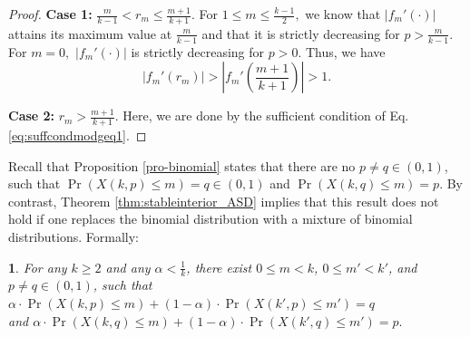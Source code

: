 \documentclass[12pt]{article}
\numberwithin{equation}{section}
\numberwithin{figure}{section}
\theoremstyle{definition}
\theoremstyle{plain}
\theoremstyle{plain}
\theoremstyle{plain}
\theoremstyle{remark}
\theoremstyle{plain}
\theoremstyle{plain}
\newtheorem{cor}{\protect\corollaryname}
\providecommand{\corollaryname}{Corollary}
\begin{document}
\begin{proof}
\textbf{Case 1:} $\frac{m}{k-1} < r_m \leq \frac{m+1}{k+1}$. 
For $1\leq m \leq \frac{k-1}{2},$ we know that $|f_m'(\cdot)|$ attains its maximum value at $\frac{m}{k-1}$ and that it is strictly decreasing for $p > \frac{m}{k-1}.$ For $m=0,$ $|f_m'(\cdot)|$ is strictly decreasing for $p>0.$ Thus, we have
\[
|f_m'(r_m)| > \left|f_m'\left(\frac{m+1}{k+1} \right)\right| > 1.
\]

\textbf{Case 2:} $r_m > \frac{m+1}{k+1}.$ Here, we are done by the sufficient condition of Eq. \eqref{eq:suffcondmodgeq1}.

\end{proof}
Recall that Proposition \ref{pro-binomial} states that there are no $p\neq q\in(0,1)$, such that $\Pr\left(X(k,p)\leq m\right)=q\in\left(0,1\right)$ and $\Pr\left(X(k,q)\leq m\right)=p.$ By contrast, Theorem \ref{thm:stableinterior_ASD} implies that this result does not hold if one replaces the binomial distribution with a mixture of binomial distributions. Formally:
\begin{cor}
For any $k\geq2$ and any $\alpha<\frac{1}{k}$, there exist $0\leq m<k$, $0\leq m'<k'$, and $p\neq q \in (0,1)$, such that 
$\alpha\cdot\Pr\left(X(k,p)\leq m\right)+(1-\alpha)\cdot \Pr\left(X(k',p)\leq m'\right)=q$\\
\hspace*{3.85cm}and  $\alpha\cdot\Pr\left(X(k,q)\leq m\right)+(1-\alpha)\cdot \Pr\left(X(k',q)\leq m'\right)=p.$
\end{cor}
\end{document}
